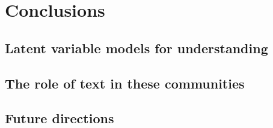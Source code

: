 \chapter{Conclusions}

\section{Latent variable models for understanding}

\section{The role of text in these communities}

\section{Future directions}
